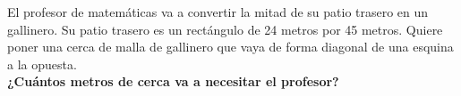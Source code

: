 El profesor de matemáticas va a convertir la mitad de su patio trasero en un gallinero.
Su patio trasero es un rectángulo de 24 metros por 45 metros.
Quiere poner una cerca de malla de gallinero que vaya de forma diagonal de una esquina a la opuesta.\\
\textbf{¿Cuántos metros de cerca va a necesitar el profesor?}

\begin{solutionbox}{10cm}
\end{solutionbox}